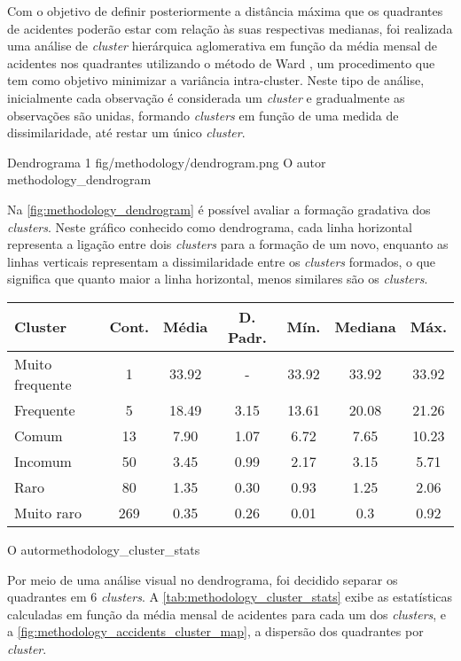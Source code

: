Com o objetivo de definir posteriormente a distância máxima que os quadrantes de acidentes poderão estar com relação às suas respectivas medianas, foi realizada uma análise de \textit{cluster} hierárquica aglomerativa em função da média mensal de acidentes nos quadrantes utilizando o método de Ward \cite{Ward1963}, um procedimento que tem como objetivo minimizar a variância intra-cluster. Neste tipo de análise, inicialmente cada observação é considerada um \textit{cluster} e gradualmente as observações são unidas, formando \textit{clusters} em função de uma medida de dissimilaridade, até restar um único \textit{cluster}. 

\figurah
{Dendrograma}
{1}
{fig/methodology/dendrogram.png}
{O autor}
{methodology_dendrogram}
{}
{}

Na \autoref{fig:methodology_dendrogram} é possível avaliar a formação gradativa dos \textit{clusters}. Neste gráfico conhecido como dendrograma, cada linha horizontal representa a ligação entre dois \textit{clusters} para a formação de um novo, enquanto as linhas verticais representam a dissimilaridade entre os \textit{clusters} formados, o que significa que quanto maior a linha horizontal, menos similares são os \textit{clusters}.

{\begin{tabular}{l|c|c|c|c|c|c}\hline
    Cluster & Cont. & Média & D. Padr. & Mín. & Mediana & Máx.\\ \hline\hline
    Muito frequente & 1 & 33.92 & - & 33.92 & 33.92 & 33.92 \\
    Frequente & 5 & 18.49 & 3.15 & 13.61 & 20.08 & 21.26 \\
    Comum & 13 & 7.90 & 1.07 & 6.72 & 7.65 & 10.23 \\
    Incomum & 50 & 3.45 & 0.99 & 2.17 & 3.15 & 5.71 \\
    Raro & 80 & 1.35 & 0.30 & 0.93 & 1.25 & 2.06 \\
    Muito raro & 269 & 0.35 & 0.26 & 0.01 & 0.3 & 0.92 \\
    \hline
\end{tabular}}
{O autor}{methodology_cluster_stats}{}{}


Por meio de uma análise visual no dendrograma, foi decidido separar os quadrantes em 6 \textit{clusters}. A \autoref{tab:methodology_cluster_stats} exibe as estatísticas calculadas em função da média mensal de acidentes para cada um dos \textit{clusters}, e a \autoref{fig:methodology_accidents_cluster_map}, a dispersão dos quadrantes por \textit{cluster}.

